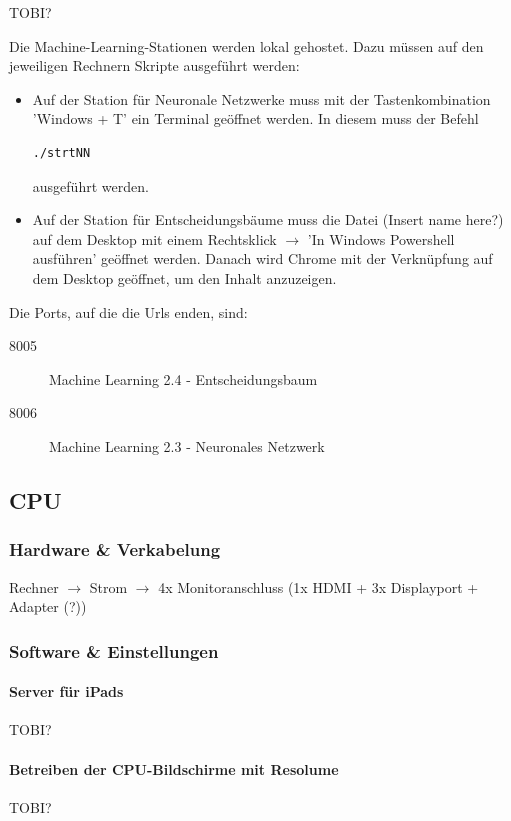 \documentclass [titlepage,a4paper]{article}
\begin{document}
TOBI?

Die Machine-Learning-Stationen werden lokal gehostet. Dazu müssen auf den jeweiligen Rechnern Skripte ausgeführt werden:

\begin{itemize}
\item Auf der Station für Neuronale Netzwerke muss mit der Tastenkombination 'Windows + T' ein Terminal geöffnet werden. In diesem muss der Befehl \begin{verbatim}
./strtNN
\end{verbatim} ausgeführt werden.
\item Auf der Station für Entscheidungsbäume muss die Datei (Insert name here?) auf dem Desktop mit einem Rechtsklick $\rightarrow$ 'In Windows Powershell ausführen' geöffnet werden. Danach wird Chrome mit der Verknüpfung auf dem Desktop geöffnet, um den Inhalt anzuzeigen.
\end{itemize}

Die Ports, auf die die Urls enden, sind: \begin{description}
    \item[8005] Machine Learning 2.4 - Entscheidungsbaum
    \item[8006] Machine Learning 2.3 - Neuronales Netzwerk
\end{description}

\subsection{CPU}

\subsubsection{Hardware \& Verkabelung}

Rechner $\rightarrow$ Strom
        $\rightarrow$ 4x Monitoranschluss (1x HDMI + 3x Displayport + Adapter (?))

\subsubsection{Software \& Einstellungen}

\paragraph{Server für iPads}
TOBI?

\paragraph{Betreiben der CPU-Bildschirme mit Resolume}
TOBI?
\end{document}
